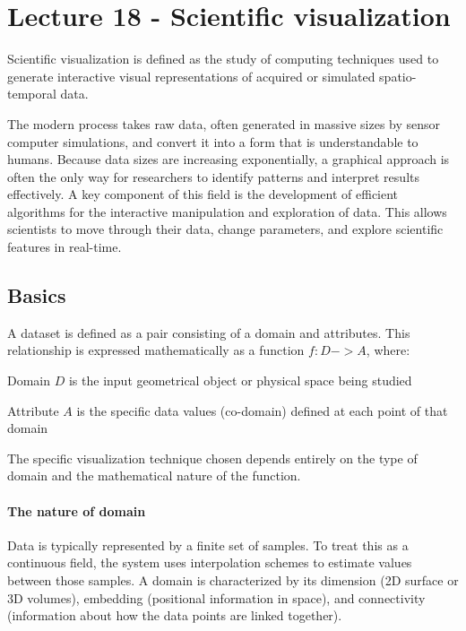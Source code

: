\chapter{Lecture 18 - Scientific visualization}

\begin{definition}
    Scientific visualization is defined as the study of computing techniques used to generate interactive visual representations of acquired or simulated spatio-temporal data.
\end{definition}

The modern process takes raw data, often generated in massive sizes by sensor computer simulations, and convert it into a form that is understandable to humans. Because data sizes are increasing exponentially, a graphical approach is often the only way for researchers to identify patterns and interpret results effectively. A key component of this field is the development of efficient algorithms for the interactive manipulation and exploration of data. This allows scientists to move through their data, change parameters, and explore scientific features in real-time.

\section{Basics}

\begin{definition}[Dataset]
    A dataset is defined as a pair consisting of a domain and attributes. This relationship is expressed mathematically as a function \(f: D -> A\), where:\par
    Domain \(D\) is the input geometrical object or physical space being studied\par
    Attribute \(A\) is the specific data values (co-domain) defined at each point of that domain
\end{definition}

The specific visualization technique chosen depends entirely on the type of domain and the mathematical nature of the function.

\subsubsection{The nature of domain}
Data is typically represented by a finite set of samples. To treat this as a continuous field, the system uses interpolation schemes to estimate values between those samples. A domain is characterized by its dimension (2D surface or 3D volumes), embedding (positional information in space), and connectivity (information about how the data points are linked together).

